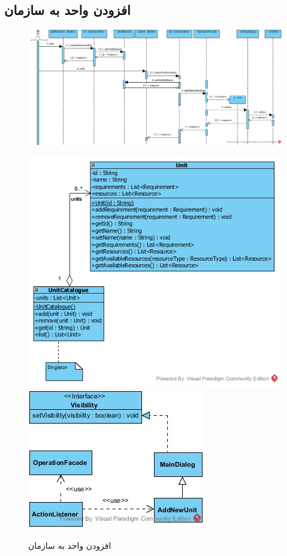 \begin{landscape}
\newpage
\section{افزودن واحد به سازمان}
\begin{figure}[H]
	\centering
	\includegraphics[scale=0.7]{img/sequence-design/AddUnitToOrganization}
\end{figure}
\begin{figure}[H]
	\centering
	\includegraphics[scale=0.5]{img/sequence-design/AddUnitToOrganizationC}
	\includegraphics[scale=0.7]{img/sequence-design/AddUnitToOrganizationUI}
	\caption{افزودن واحد به سازمان}
\end{figure}


\end{landscape}
